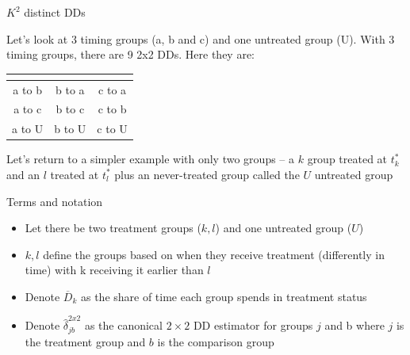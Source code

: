 \documentclass{beamer}
\begin{document}
\begin{frame}{$K^2$ distinct DDs}

Let's look at 3 timing groups (a, b and c) and one untreated group (U).  With 3 timing groups, there are 9 2x2 DDs.  Here they are:


\begin{center}
\begin{tabular}{c|c|c}
\multicolumn{1}{l}{} &
\multicolumn{1}{l}{} &
\multicolumn{1}{l}{} \\
\midrule
a to b & b to a & c to a \\
a to c & b to c & c to b \\
a to U & b to U & c to U \\
\midrule
\end{tabular}
\end{center}

\bigskip

Let's return to a simpler example with only two groups -- a $k$ group treated at $t_k^*$ and an $l$ treated at $t_l^*$ plus an never-treated group called the $U$ untreated group
\end{frame} 


\begin{frame}{Terms and notation}

\begin{itemize}
\item Let there be two treatment groups ($k,l$) and one untreated group ($U$)
\item $k,l$ define the groups based on when they receive treatment (differently in time) with k receiving it earlier than $l$
\item Denote $\overline{D}_k$ as the share of time each group spends in treatment status
\item Denote $\widehat{\delta}_{jb}^{2x2}$ as the canonical $2\times 2$ DD estimator for groups $j$ and b where $j$ is the treatment group and $b$ is the comparison group
\end{itemize}

\end{frame}


\end{document}
